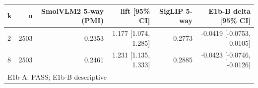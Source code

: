 \begin{tabular}{lrrrrr}
\toprule
k & n & SmolVLM2 5-way (PMI) & lift [95\% CI] & SigLIP 5-way & E1b-B delta [95\% CI] \\
\midrule
2 & 2503 & 0.2353 & 1.177 [1.074, 1.285] & 0.2773 & -0.0419 [-0.0753, -0.0105] \\
8 & 2503 & 0.2461 & 1.231 [1.135, 1.333] & 0.2885 & -0.0423 [-0.0746, -0.0126] \\
\midrule
\multicolumn{6}{l}{E1b-A: PASS; E1b-B descriptive} \\
\bottomrule
\end{tabular}
